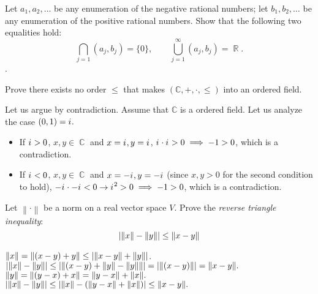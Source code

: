 \documentclass[12pt,letterpaper,boxed]{hmcpset}
\DeclarePairedDelimiter\abs{\lvert}{\rvert}
\DeclarePairedDelimiter{\norm}{\lVert}{\rVert}
\DeclareMathOperator{\C}{\mathbb{C}}
\DeclareMathOperator{\R}{\mathbb{R}}
\newcommand{\iu}{{i\mkern1mu}}
\begin{document}
\begin{problem}[Exercise 5.5.]
Let $a_1, a_2, \dots$ be any enumeration of the negative rational numbers; let $b_1, b_2, \dots$ be any enumeration of the positive rational numbers. Show that the following two equalities hold: $$ \bigcap_{j = 1}(a_j,b_j) = \{0\}, \quad \quad \bigcup_{j=1}^{\infty}(a_j,b_j)=\R.$$.
\end{problem}

\begin{solution}

\end{solution}



\begin{problem}[Exercise 6.4.]
Prove there exists no order $\leq$ that makes $(\mathbb{C},+,\cdot,\leq)$ into an ordered field.
\end{problem}

\begin{solution}
Let us argue by contradiction. Assume that $\mathbb{C}$ is a ordered field. Let us analyze the case $(0,1)= \iu.$ 

\vspace{-2mm}
\begin{itemize}
	\itemsep0em
	\item If $\iu > 0$, $x, y \in \C$ and $x = \iu, y = \iu$, $\iu \cdot\iu > 0 \implies -1 > 0$, which is a contradiction.
	\item If $\iu < 0$, $x, y \in \C$ and $x = -\iu, y = -\iu$ (since $x, y > 0$ for the second condition to hold), $-\iu \cdot - \iu < 0 \rightarrow \iu^{2} > 0 \implies -1 > 0$, which is a contradiction.
\end{itemize}
\end{solution}


\begin{problem}[Exercise 1.7.]
Let $\left\lVert \cdot \right\rVert$ be a norm on a real vector space $V$. Prove the \textit{reverse triangle inequality}: $$\abs{\left\lVert x \right\rVert - \left\lVert y \right\rVert} \leq \left\lVert x - y \right\rVert$$
\end{problem}

\begin{solution}
$\norm{x}= \norm{(x - y) + y} \leq \abs{\norm{x - y} + \norm{y}}$. $ \abs{\norm{x} - \norm{y}} \leq \abs{\norm{(x - y) + \norm{y} - \norm{y}}} = \abs{\norm{(x - y)}}=\norm{x - y}.$ \\
$\norm{y}= \norm{(y - x) + x}=\norm{y - x} + \norm{x}. $$\abs{\norm{x} - \norm{y}} \leq \abs{\norm{x} - (\norm{y - x} + \norm{x})} \leq \norm{x - y}.$

\end{solution}
\end{document}
